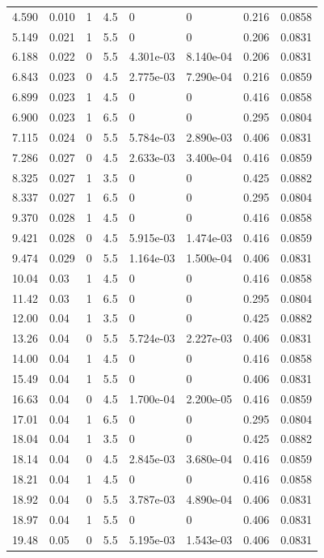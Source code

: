 \documentclass[preview]{standalone}
\begin{document}
{{\begin{tabular}{L{1.2cm}C{1.2cm} C{0.3cm}C{0.5cm} C{1.4cm}C{1.4cm} C{1.4cm}C{1.4cm}}
  4.590  &  0.010  & 1     & 4.5 &  0  & 0  & 0.216 &  0.0858   \\ 
  5.149  &  0.021  & 1     & 5.5 &  0  & 0  & 0.206 &  0.0831   \\ 
  6.188  &  0.022  & 0     & 5.5 &  4.301e-03  & 8.140e-04  & 0.206 &  0.0831   \\ 
  6.843  &  0.023  & 0     & 4.5 &  2.775e-03  & 7.290e-04  & 0.216 &  0.0859   \\ 
  6.899  &  0.023  & 1     & 4.5 &  0  & 0  & 0.416 &  0.0858   \\ 
  6.900  &  0.023  & 1     & 6.5 &  0  & 0  & 0.295 &  0.0804   \\ 
  7.115  &  0.024  & 0     & 5.5 &  5.784e-03  & 2.890e-03  & 0.406 &  0.0831   \\ 
  7.286  &  0.027  & 0     & 4.5 &  2.633e-03  & 3.400e-04  & 0.416 &  0.0859   \\ 
  8.325  &  0.027  & 1     & 3.5 &  0  & 0  & 0.425 &  0.0882   \\ 
  8.337  &  0.027  & 1     & 6.5 &  0  & 0  & 0.295 &  0.0804   \\ 
  9.370  &  0.028  & 1     & 4.5 &  0  & 0  & 0.416 &  0.0858   \\ 
  9.421  &  0.028  & 0     & 4.5 &  5.915e-03  & 1.474e-03  & 0.416 &  0.0859   \\ 
  9.474  &  0.029  & 0     & 5.5 &  1.164e-03  & 1.500e-04  & 0.406 &  0.0831   \\ 
  10.04  &  0.03  & 1     & 4.5 &  0  & 0  & 0.416 &  0.0858   \\ 
  11.42  &  0.03  & 1     & 6.5 &  0  & 0  & 0.295 &  0.0804   \\ 
  12.00  &  0.04  & 1     & 3.5 &  0  & 0  & 0.425 &  0.0882   \\ 
  13.26  &  0.04  & 0     & 5.5 &  5.724e-03  & 2.227e-03  & 0.406 &  0.0831   \\ 
  14.00  &  0.04  & 1     & 4.5 &  0  & 0  & 0.416 &  0.0858   \\ 
  15.49  &  0.04  & 1     & 5.5 &  0  & 0  & 0.406 &  0.0831   \\ 
  16.63  &  0.04  & 0     & 4.5 &  1.700e-04  & 2.200e-05  & 0.416 &  0.0859   \\ 
  17.01  &  0.04  & 1     & 6.5 &  0  & 0  & 0.295 &  0.0804   \\ 
  18.04  &  0.04  & 1     & 3.5 &  0  & 0  & 0.425 &  0.0882   \\ 
  18.14  &  0.04  & 0     & 4.5 &  2.845e-03  & 3.680e-04  & 0.416 &  0.0859   \\ 
  18.21  &  0.04  & 1     & 4.5 &  0  & 0  & 0.416 &  0.0858   \\ 
  18.92  &  0.04  & 0     & 5.5 &  3.787e-03  & 4.890e-04  & 0.406 &  0.0831   \\ 
  18.97  &  0.04  & 1     & 5.5 &  0  & 0  & 0.406 &  0.0831   \\ 
  19.48  &  0.05  & 0     & 5.5 &  5.195e-03  & 1.543e-03  & 0.406 &  0.0831   \\ 
\hline 
\end{tabular} 

}}
\end{document}
